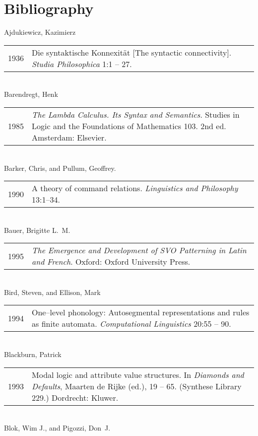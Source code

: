 \newenvironment{eintrag}{\begin{tabular}{@{\quad}p{1.6cm}@{}p{9.8cm}}}%
{\end{tabular}}
\chapter*{Bibliography}
Ajdukiewicz, Kazimierz 
\\
\begin{eintrag}
1936 & Die syntaktische {K}onnexit\"at [The syntactic connectivity]. 
        {\em Studia Philosophica} 1:1 -- 27.
\end{eintrag}
\\[2.5mm]
Barendregt, Henk
\\
\begin{eintrag}
1985 & {\em The Lambda Calculus. Its Syntax and Semantics}.
	Studies in Logic and the Foundations of Mathematics 103. 
	2nd ed. Amsterdam: Elsevier.
\end{eintrag}
\\[2.5mm]
Barker, Chris, and Pullum, Geoffrey.
\\
\begin{eintrag}
1990 & A theory of command relations. {\em Linguistics and Philosophy} 
13:1--34.
\end{eintrag}
\\[2.5mm]
Bauer, Brigitte L.~M. 
\\
\begin{eintrag}
1995 & {\em The {E}mergence and {D}evelopment of {SVO} {P}atterning in
  {L}atin and {F}rench}. Oxford: Oxford University Press.
\end{eintrag}
\\[2.5mm]
Bird, Steven, and Ellison, Mark
\\
\begin{eintrag}
1994 & One--level phonology: {A}utosegmental representations and rules as
  finite automata. {\em Computational Linguistics} 20:55 -- 90.
\end{eintrag}
\\[2.5mm]
Blackburn, Patrick
\\
\begin{eintrag}
1993 & Modal logic and attribute value structures.  In {\em Diamonds and 
	Defaults}, Maarten de Rijke (ed.),  19 -- 65.  (Synthese
	Library 229.) Dordrecht: Kluwer.
\end{eintrag}
\\[2.5mm]
Blok, Wim J., and Pigozzi, Don~J. 
\\
